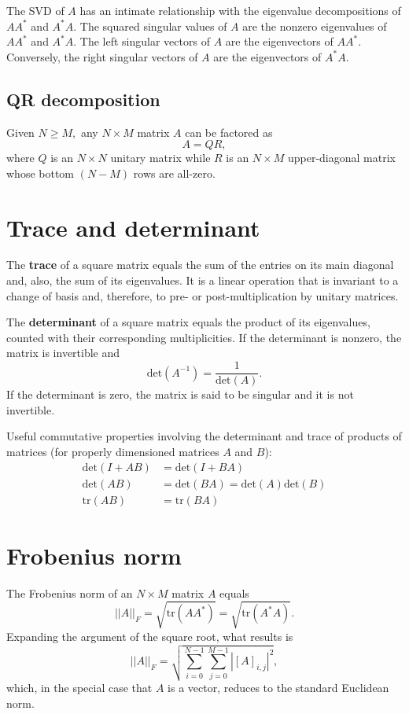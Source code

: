 \documentclass[a4paper, 12pt]{book}
\begin{document}
The SVD of $A$ has an intimate relationship with the eigenvalue decompositions of $AA^{*}$ and $A^{*}A$. The squared singular values of $A$ are the nonzero eigenvalues of $AA^{*}$ and $A^{*}A$. The left singular vectors of $A$ are the eigenvectors of $AA^{*}$. Conversely, the right singular vectors of $A$ are the eigenvectors of $A^{*}A$.

\subsection{QR decomposition}
Given $N \ge M,$ any $N \times M$ matrix $A$ can be factored as
\begin{equation}
    A = QR, \tag{B.21}
\end{equation}
where $Q$ is an $N \times N$ unitary matrix while $R$ is an $N \times M$ upper-diagonal matrix whose bottom $(N-M)$ rows are all-zero.

\section{Trace and determinant}
The \textbf{trace} of a square matrix equals the sum of the entries on its main diagonal and, also, the sum of its eigenvalues. It is a linear operation that is invariant to a change of basis and, therefore, to pre- or post-multiplication by unitary matrices.

The \textbf{determinant} of a square matrix equals the product of its eigenvalues, counted with their corresponding multiplicities. If the determinant is nonzero, the matrix is invertible and
\begin{equation}
    \text{det}(A^{-1}) = \frac{1}{\text{det}(A)}. \tag{B.22}
\end{equation}
If the determinant is zero, the matrix is said to be singular and it is not invertible.

Useful commutative properties involving the determinant and trace of products of matrices (for properly dimensioned matrices $A$ and $B$):
\begin{align}
    \text{det}(I+AB) &= \text{det}(I+BA) \tag{B.23} \\
    \text{det}(AB) &= \text{det}(BA) = \text{det}(A)\text{det}(B) \tag{B.24} \\
    \text{tr}(AB) &= \text{tr}(BA) \tag{B.26}
\end{align}

\section{Frobenius norm}
The Frobenius norm of an $N \times M$ matrix $A$ equals
\begin{equation}
    ||A||_{F} = \sqrt{\text{tr}(AA^{*})} = \sqrt{\text{tr}(A^{*}A)}. \tag{B.27}
\end{equation}
Expanding the argument of the square root, what results is
\begin{equation}
    ||A||_{F} = \sqrt{\sum_{i=0}^{N-1}\sum_{j=0}^{M-1}|[A]_{i,j}|^{2}}, \tag{B.29}
\end{equation}
which, in the special case that $A$ is a vector, reduces to the standard Euclidean norm.
\end{document}
